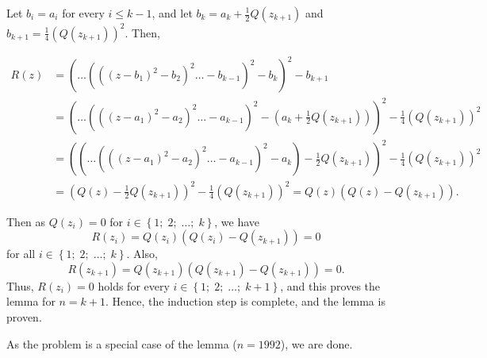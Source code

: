 \begin{enumerate}
 Let $b_{i}=a_{i}$ for every $i\le k-1$, and let $b_{k}=a_{k}+\frac{1}{2}Q\left(z_{k+1}\right)$ and $b_{k+1}=\frac{1}{4}\left(Q\left(z_{k+1}\right)\right)^{2}$. Then,

 

 \begin{align*} R\left(z\right)&=\left(\ldots\left(\left(\left(z-b_{1}\right)^{2}-b_{2}\right)^{2}\ldots-b_{k-1}\right)^{2}-b_{k}\right)^{2}-b_{k+1}\\ & =\left(\ldots\left(\left(\left(z-a_{1}\right)^{2}-a_{2}\right)^{2}\ldots-a_{k-1}\right)^{2}-\left(a_{k}+\frac{1}2Q\left(z_{k+1}\right)\right)\right)^{2}-\frac{1}4\left(Q\left(z_{k+1}\right)\right)^{2} \\ & =\left(\left(\ldots\left(\left(\left(z-a_{1}\right)^{2}-a_{2}\right)^{2}\ldots-a_{k-1}\right)^{2}-a_{k}\right)-\frac{1}2Q\left(z_{k+1}\right)\right)^{2}-\frac{1}4\left(Q\left(z_{k+1}\right)\right)^{2}\\ &=\left(Q\left(z\right)-\frac{1}2Q\left(z_{k+1}\right)\right)^{2}-\frac{1}4\left(Q\left(z_{k+1}\right)\right)^{2}=Q\left(z\right)\left(Q\left(z\right)-Q\left(z_{k+1}\right)\right). \end{align*}


 
Then as $Q\left(z_{i}\right)=0$ for $i\in\left\{1;\;2;\;\ldots;\;k\right\}$, we have 
 \[R\left(z_{i}\right)=Q\left(z_{i}\right)\left(Q\left(z_{i}\right)-Q\left(z_{k+1}\right)\right)=0\]for all $i\in\left\{1;\;2;\;\ldots;\;k\right\}$. Also, 
 \[R\left(z_{k+1}\right)=Q\left(z_{k+1}\right)\left(Q\left(z_{k+1}\right)-Q\left(z_{k+1}\right)\right)=0.\]Thus, $R\left(z_{i}\right)=0$ holds for every $i\in\left\{1;\;2;\;\ldots;\;k+1\right\}$, and this proves the lemma for $n = k + 1$. Hence, the induction step is complete, and the lemma is proven.

 As the problem is a special case of the lemma ($n=1992$), we are done.

 


\end{enumerate}